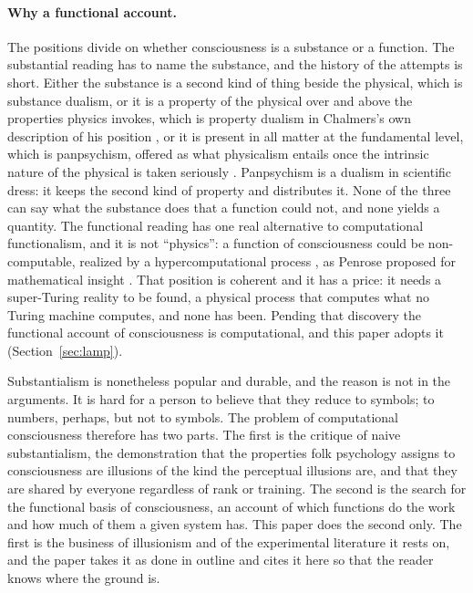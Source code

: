 \paragraph{Why a functional account.}
The positions divide on whether consciousness is a substance or a function. The substantial reading
has to name the substance, and the history of the attempts is short. Either the substance is a second
kind of thing beside the physical, which is substance dualism, or it is a property of the physical
over and above the properties physics invokes, which is property dualism in Chalmers's own
description of his position \citep{chalmers1995}, or it is present in all matter at the fundamental
level, which is panpsychism, offered as what physicalism entails once the intrinsic nature of the
physical is taken seriously \citep{strawson2006,goff2017}. Panpsychism is a dualism in scientific
dress: it keeps the second kind of property and distributes it. None of the three can say what the
substance does that a function could not, and none yields a quantity. The functional reading has one
real alternative to computational functionalism, and it is not ``physics'': a function of
consciousness could be non-computable, realized by a hypercomputational process
\citep{copeland2002}, as Penrose proposed for mathematical insight \citep{penrose1989}. That
position is coherent and it has a price: it needs a super-Turing reality to be found, a physical
process that computes what no Turing machine computes, and none has been. Pending that discovery the
functional account of consciousness is computational, and this paper adopts it
(Section~\ref{sec:lamp}).

Substantialism is nonetheless popular and durable, and the reason is not in the arguments. It is hard
for a person to believe that they reduce to symbols; to numbers, perhaps, but not to symbols. The
problem of computational consciousness therefore has two parts. The first is the critique of naive
substantialism, the demonstration that the properties folk psychology assigns to consciousness are
illusions of the kind the perceptual illusions are, and that they are shared by everyone regardless of
rank or training. The second is the search for the functional basis of consciousness, an account of
which functions do the work and how much of them a given system has. This paper does the second only.
The first is the business of illusionism and of the experimental literature it rests on, and the
paper takes it as done in outline and cites it here so that the reader knows where the ground is.

